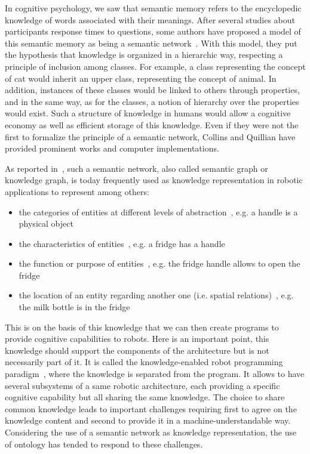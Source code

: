 In cognitive psychology, we saw that semantic memory refers to the encyclopedic knowledge of words associated with their meanings. After several studies about participants response times to questions, some authors have proposed a model of this semantic memory as being a semantic network~\cite{collins_1969_retrieval, collins_1970_does}. With this model, they put the hypothesis that knowledge is organized in a hierarchic way, respecting a principle of inclusion among classes. For example, a class representing the concept of cat would inherit an upper class, representing the concept of animal. In addition, instances of these classes would be linked to others through properties, and in the same way, as for the classes, a notion of hierarchy over the properties would exist. Such a structure of knowledge in humans would allow a cognitive economy as well as efficient storage of this knowledge. Even if they were not the first to formalize the principle of a semantic network, Collins and Quillian have provided prominent works and computer implementations.

As reported in~\cite{prasad_2020_knowledge}, such a semantic network, also called semantic graph or knowledge graph, is today frequently used as knowledge representation in robotic applications to represent among others:

\begin{itemize}
  \item the categories of entities at different levels of abstraction~\cite{balint_2018_variations}, e.g. a handle is a physical object
  \item the characteristics of entities~\cite{tenorth_2017_representations}, e.g. a fridge has a handle
  \item the function or purpose of entities~\cite{paulius_2019_functional}, e.g. the fridge handle allows to open the fridge
  \item the location of an entity regarding another one (i.e. spatial relations)~\cite{singh_2020_fuzzy}, e.g. the milk bottle is in the fridge
\end{itemize}

This is on the basis of this knowledge that we can then create programs to provide cognitive capabilities to robots. Here is an important point, this knowledge should support the components of the architecture but is not necessarily part of it. It is called the knowledge-enabled robot programming paradigm~\cite{beetz_2012_cognition}, where the knowledge is separated from the program. It allows to have several subsystems of a same robotic architecture, each providing a specific cognitive capability but all sharing the same knowledge. The choice to share common knowledge leads to important challenges requiring first to agree on the knowledge content and second to provide it in a machine-understandable way. Considering the use of a semantic network as knowledge representation, the use of ontology has tended to respond to these challenges.

